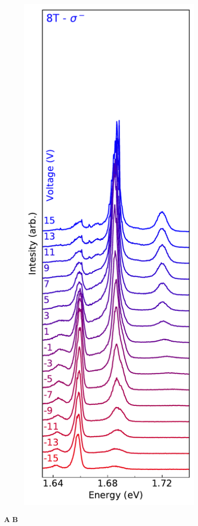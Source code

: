 \begin{figure}[h]
\begin{subfigure}{0.32\textwidth}
	\end{subfigure}
	\begin{subfigure}{0.32\textwidth}
		\caption{}
		\includegraphics[width=\textwidth]{waterfall_8T_sm}
	\end{subfigure}
	\caption{\textbf{A}  \textbf{B}}\label{waterfall}
\end{figure}

